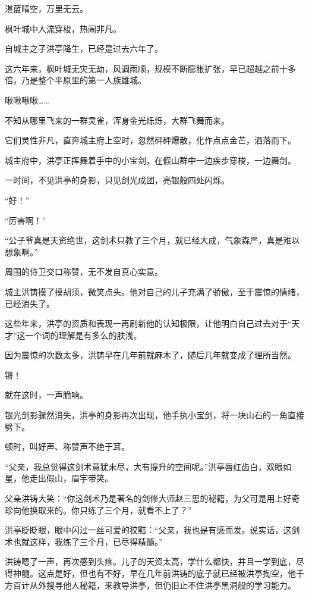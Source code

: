
\begin{this_body}



湛蓝晴空，万里无云。

枫叶城中人流穿梭，热闹非凡。

自城主之子洪亭降生，已经是过去六年了。

这六年来，枫叶城无灾无劫，风调雨顺，规模不断膨胀扩张，早已超越之前十多倍，乃是整个平原里的第一人族雄城。

啾啾啾啾……

不知从哪里飞来的一群灵雀，浑身金光烁烁，大群飞舞而来。

它们灵性非凡，直奔城主府上空时，忽然砰砰爆散，化作点点金芒，洒落而下。

城主府中，洪亭正挥舞着手中的小宝剑，在假山群中一边疾步穿梭，一边舞剑。

一时间，不见洪亭的身影，只见剑光成团，亮银般四处闪烁。

“好！”

“厉害啊！”

“公子爷真是天资绝世，这剑术只教了三个月，就已经大成，气象森严，真是难以想象啊。”

周围的侍卫交口称赞，无不发自真心实意。

城主洪铸摸了摸胡须，微笑点头。他对自己的儿子充满了骄傲，至于震惊的情绪，已经消失了。

这些年来，洪亭的资质和表现一再刷新他的认知极限，让他明白自己过去对于“天才”这一个词的理解是有多么的肤浅。

因为震惊的次数太多，洪铸早在几年前就麻木了，随后几年就变成了理所当然。

锵！

就在这时，一声脆响。

银光剑影骤然消失，洪亭的身影再次出现，他手执小宝剑，将一块山石的一角直接劈下。

顿时，叫好声、称赞声不绝于耳。

“父亲，我总觉得这剑术意犹未尽，大有提升的空间呢。”洪亭唇红齿白，双眼如星，他走出假山，眉宇带笑。

父亲洪铸大笑：“你这剑术乃是著名的剑修大师赵三思的秘籍，为父可是用上好奇珍向他换取来的。你只练了三个月，就看不上了？”

洪亭眨眨眼，眼中闪过一丝可爱的狡黠：“父亲，我也是有感而发。说实话，这剑术也就这样，我练了三个月，已尽得精髓。”

洪铸嗯了一声，再次感到头疼。儿子的天资太高，学什么都快，并且一学到底，尽得神髓。这点是好，但也有不好，早在几年前洪铸的底子就已经被洪亭掏空，他千方百计从外搜寻他人秘籍，来教导洪亭，但仍旧止不住洪亭黑洞般的学习能力。


\end{this_body}
